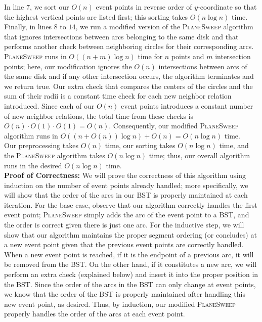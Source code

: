 \documentclass[11pt]{article}
\begin{document}
\begin{enumerate}
    In line $7$, we sort our $O(n)$ event points in reverse order of $y$-coordinate so that the highest vertical points are listed first; this sorting takes $O(n \log n)$ time. Finally, in lines $8$ to $14$, we run a modified version of the \textsc{PlaneSweep} algorithm that ignores intersections between arcs belonging to the same disk and that performs another check between neighboring circles for their corresponding arcs. \textsc{PlaneSweep} runs in $O((n+m) \log n)$ time for $n$ points and $m$ intersection points; here, our modification ignores the $O(n)$ intersections between arcs of the same disk and if any other intersection occurs, the algorithm terminates and we return true. Our extra check that compares the centers of the circles and the sum of their radii is a constant time check for each new neighbor relation introduced. Since each of our $O(n)$ event points introduces a constant number of new neighbor relations, the total time from these checks is $O(n) \cdot O(1) \cdot O(1) = O(n)$. Consequently, our modified \textsc{PlaneSweep} algorithm runs in $O((n+ O(n))\log n) + O(n) = O(n \log n)$ time. \\

    Our preprocessing takes $O(n)$ time, our sorting takes $O(n \log n)$ time, and the \textsc{PlaneSweep} algorithm takes $O(n \log n)$ time; thus, our overall algorithm runs in the desired $O(n \log n)$ time. \\

    \textbf{Proof of Correctness:} We will prove the correctness of this algorithm using induction on the number of event points already handled; more specifically, we will show that the order of the arcs in our BST is properly maintained at each iteration. For the base case, observe that our algorithm correctly handles the first event point; \textsc{PlaneSweep} simply adds the arc of the event point to a BST, and the order is correct given there is just one arc. For the inductive step, we will show that our algorithm maintains the proper segment ordering (or concludes) at a new event point given that the previous event points are correctly handled. When a new event point is reached, if it is the endpoint of a previous arc, it will be removed from the BST. On the other hand, if it constitutes a new arc, we will perform an extra check (explained below) and insert it into the proper position in the BST. Since the order of the arcs in the BST can only change at event points, we know that the order of the BST is properly maintained after handling this new event point, as desired. Thus, by induction, our modified \textsc{PlaneSweep} properly handles the order of the arcs at each event point.  \\
    

\end{enumerate}
\end{document}
